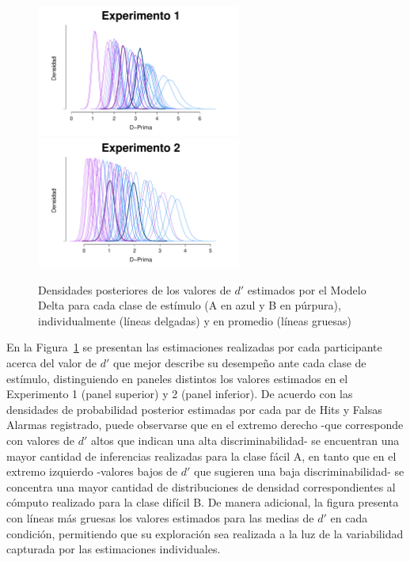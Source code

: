 \begin{figure}[th]
\centering
\includegraphics[width=0.6\textwidth]{Figures/MDelta_Dprima_E1}\\
\includegraphics[width=0.6\textwidth]{Figures/MDelta_Dprima_E2}\\
\caption[Modelo Delta: Densidades posteriores de los valores de $d'$ estimados individualmente, y en promedio, por cada experimento]{Densidades posteriores de los valores de $d'$ estimados por el Modelo Delta para cada clase de estímulo (A en azul y B en púrpura), individualmente (líneas delgadas) y en promedio (líneas gruesas)}
\label{fig:Delta_Dprima}
\end{figure}

En la Figura~\ref{fig:Delta_Dprima} se presentan las estimaciones realizadas por cada participante acerca del valor de $d'$ que mejor describe su desempeño ante cada clase de estímulo, distinguiendo en paneles distintos los valores estimados en el Experimento 1 (panel superior) y 2 (panel inferior). De acuerdo con las densidades de probabilidad posterior estimadas por cada par de Hits y Falsas Alarmas registrado, puede observarse que en el extremo derecho -que corresponde con valores de $d'$ altos que indican una alta discriminabilidad- se encuentran una mayor cantidad de inferencias realizadas para la clase fácil A, en tanto que en el extremo izquierdo -valores bajos de $d'$ que sugieren una baja discriminabilidad- se concentra una mayor cantidad de distribuciones de densidad correspondientes al cómputo realizado para la clase difícil B. De manera adicional, la figura presenta con líneas más gruesas los valores estimados para las medias de $d'$ en cada condición, permitiendo que su exploración sea realizada a la luz de la variabilidad capturada por las estimaciones individuales.\\

